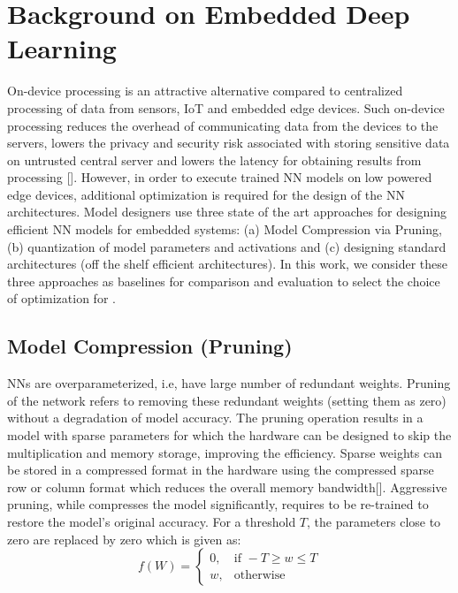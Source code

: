 \section{Background on Embedded Deep Learning}
\label{background}

On-device processing is an attractive alternative compared to centralized processing of data from sensors, IoT and embedded edge devices.
Such on-device processing reduces the overhead of communicating data from the devices to the servers, lowers the privacy and security risk associated with storing sensitive data on untrusted central server and lowers the latency for obtaining results from processing [].
However, in order to execute trained NN models on low powered edge devices, additional optimization is required for the design of the NN architectures.
Model designers use three state of the art approaches for designing efficient NN models for embedded systems: (a) Model Compression via Pruning, (b) quantization of model parameters and activations and (c) designing standard architectures (off the shelf efficient architectures).
In this work, we consider these three approaches as baselines for comparison and evaluation to select the choice of optimization for \method.

\subsection{Model Compression (Pruning)} 
NNs are overparameterized, i.e, have large number of redundant weights.
Pruning of the network refers to removing these redundant weights (setting them as zero) without a degradation of model accuracy.
The pruning operation results in a model with sparse parameters for which the hardware can be designed to skip the multiplication and memory storage, improving the efficiency.
Sparse weights can be stored in a compressed format in the hardware using the compressed sparse row or column format which reduces the overall memory bandwidth[].
Aggressive pruning, while compresses the model significantly, requires to be re-trained to restore the model's original accuracy.
For a threshold $T$, the parameters close to zero are replaced by zero which is given as:
\[
    f(W)=
\begin{cases}
    0, & \text{if } -T \geq w \leq T\\
    w,  & \text{otherwise}
\end{cases}
\]

